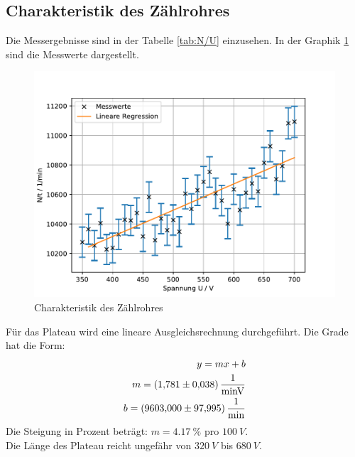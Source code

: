 \subsection{Charakteristik des Zählrohres}
Die Messergebnisse sind in der Tabelle \ref{tab:N/U} einzusehen.
In der Graphik \ref{fig:N/U} sind die Messwerte dargestellt.

\begin{figure}[h!]
  \centering
  \includegraphics[width=\textwidth]{Graphik1.pdf}
  \caption{Charakteristik des Zählrohres}
  \label{fig:N/U}
\end{figure}

Für das Plateau wird eine lineare Ausgleichsrechnung durchgeführt.
Die Grade hat die Form:
\begin{align*}
  y=mx+b\\
  m=\SI{1,781\pm0,038}{\frac{1}{min V}}\\
  b=\SI{9603\pm97,995}{\frac{1}{min}}
\end{align*}
Die Steigung in Prozent beträgt: $m=\SI{4,17}{\percent}$ pro $\SI{100}{V}$.\\
Die Länge des Plateau reicht ungefähr von $\SI{320}{V}$ bis $\SI{680}{V}$.
